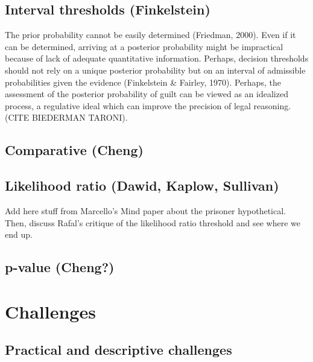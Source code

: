 \documentclass[10pt,dvipsnames]{scrartcl}
\begin{document}
\hypertarget{interval-thresholds-finkelstein}{%
\subsection{Interval thresholds
(Finkelstein)}\label{interval-thresholds-finkelstein}}

The prior probability cannot be easily determined (Friedman, 2000). Even
if it can be determined, arriving at a posterior probability might be
impractical because of lack of adequate quantitative information.
Perhaps, decision thresholds should not rely on a unique posterior
probability but on an interval of admissible probabilities given the
evidence (Finkelstein \& Fairley, 1970). Perhaps, the assessment of the
posterior probability of guilt can be viewed as an idealized process, a
regulative ideal which can improve the precision of legal reasoning.
(CITE BIEDERMAN TARONI).

\hypertarget{comparative-cheng}{%
\subsection{Comparative (Cheng)}\label{comparative-cheng}}

\hypertarget{likelihood-ratio-dawid-kaplow-sullivan}{%
\subsection{Likelihood ratio (Dawid, Kaplow,
Sullivan)}\label{likelihood-ratio-dawid-kaplow-sullivan}}

Add here stuff from Marcello's Mind paper about the prisoner
hypothetical. Then, discuss Rafal's critique of the likelihood ratio
threshold and see where we end up.

\hypertarget{p-value-cheng}{%
\subsection{p-value (Cheng?)}\label{p-value-cheng}}

\hypertarget{challenges}{%
\section{Challenges}\label{challenges}}

\hypertarget{practical-and-descriptive-challenges}{%
\subsection{Practical and descriptive
challenges}\label{practical-and-descriptive-challenges}}
\end{document}

